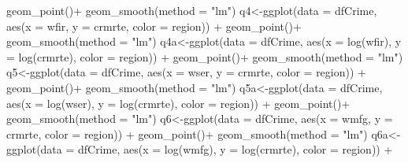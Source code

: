 \documentclass[]{article}
\newenvironment{Shaded}{}{}
\newcommand{\DataTypeTok}[1]{#1}
\newcommand{\KeywordTok}[1]{\textcolor[rgb]{0.00,0.00,1.00}{#1}}
\newcommand{\NormalTok}[1]{#1}
\newcommand{\OperatorTok}[1]{#1}
\newcommand{\StringTok}[1]{\textcolor[rgb]{0.00,0.50,0.50}{#1}}
\begin{document}
\begin{Shaded}
\begin{Highlighting}[]
\StringTok{      }\KeywordTok{geom_point}\NormalTok{()}\OperatorTok{+}
\StringTok{  }\KeywordTok{geom_smooth}\NormalTok{(}\DataTypeTok{method =} \StringTok{"lm"}\NormalTok{)}
\NormalTok{q4<-}\KeywordTok{ggplot}\NormalTok{(}\DataTypeTok{data =}\NormalTok{ dfCrime, }\KeywordTok{aes}\NormalTok{(}\DataTypeTok{x =}\NormalTok{ wfir, }\DataTypeTok{y =}\NormalTok{ crmrte, }\DataTypeTok{color =}\NormalTok{ region)) }\OperatorTok{+}\StringTok{ }
\StringTok{      }\KeywordTok{geom_point}\NormalTok{()}\OperatorTok{+}
\StringTok{  }\KeywordTok{geom_smooth}\NormalTok{(}\DataTypeTok{method =} \StringTok{"lm"}\NormalTok{)}
\NormalTok{q4a<-}\KeywordTok{ggplot}\NormalTok{(}\DataTypeTok{data =}\NormalTok{ dfCrime, }\KeywordTok{aes}\NormalTok{(}\DataTypeTok{x =} \KeywordTok{log}\NormalTok{(wfir), }\DataTypeTok{y =} \KeywordTok{log}\NormalTok{(crmrte), }\DataTypeTok{color =}\NormalTok{ region)) }\OperatorTok{+}\StringTok{ }
\StringTok{      }\KeywordTok{geom_point}\NormalTok{()}\OperatorTok{+}
\StringTok{  }\KeywordTok{geom_smooth}\NormalTok{(}\DataTypeTok{method =} \StringTok{"lm"}\NormalTok{)}
\NormalTok{q5<-}\KeywordTok{ggplot}\NormalTok{(}\DataTypeTok{data =}\NormalTok{ dfCrime, }\KeywordTok{aes}\NormalTok{(}\DataTypeTok{x =}\NormalTok{ wser, }\DataTypeTok{y =}\NormalTok{ crmrte, }\DataTypeTok{color =}\NormalTok{ region)) }\OperatorTok{+}\StringTok{ }
\StringTok{      }\KeywordTok{geom_point}\NormalTok{()}\OperatorTok{+}
\StringTok{  }\KeywordTok{geom_smooth}\NormalTok{(}\DataTypeTok{method =} \StringTok{"lm"}\NormalTok{)}
\NormalTok{q5a<-}\KeywordTok{ggplot}\NormalTok{(}\DataTypeTok{data =}\NormalTok{ dfCrime, }\KeywordTok{aes}\NormalTok{(}\DataTypeTok{x =} \KeywordTok{log}\NormalTok{(wser), }\DataTypeTok{y =} \KeywordTok{log}\NormalTok{(crmrte), }\DataTypeTok{color =}\NormalTok{ region)) }\OperatorTok{+}\StringTok{ }
\StringTok{      }\KeywordTok{geom_point}\NormalTok{()}\OperatorTok{+}
\StringTok{  }\KeywordTok{geom_smooth}\NormalTok{(}\DataTypeTok{method =} \StringTok{"lm"}\NormalTok{)}
\NormalTok{q6<-}\KeywordTok{ggplot}\NormalTok{(}\DataTypeTok{data =}\NormalTok{ dfCrime, }\KeywordTok{aes}\NormalTok{(}\DataTypeTok{x =}\NormalTok{ wmfg, }\DataTypeTok{y =}\NormalTok{ crmrte, }\DataTypeTok{color =}\NormalTok{ region)) }\OperatorTok{+}\StringTok{ }
\StringTok{      }\KeywordTok{geom_point}\NormalTok{()}\OperatorTok{+}
\StringTok{  }\KeywordTok{geom_smooth}\NormalTok{(}\DataTypeTok{method =} \StringTok{"lm"}\NormalTok{)}
\NormalTok{q6a<-}\KeywordTok{ggplot}\NormalTok{(}\DataTypeTok{data =}\NormalTok{ dfCrime, }\KeywordTok{aes}\NormalTok{(}\DataTypeTok{x =} \KeywordTok{log}\NormalTok{(wmfg), }\DataTypeTok{y =} \KeywordTok{log}\NormalTok{(crmrte), }\DataTypeTok{color =}\NormalTok{ region)) }\OperatorTok{+}\StringTok{ }

\end{Highlighting}
\end{Shaded}
\end{document}
